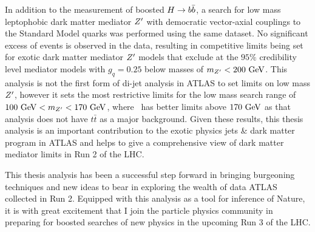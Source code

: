 In addition to the measurement of boosted $H \to b\bar{b}$, a search for low mass leptophobic dark matter mediator $Z^{\prime}$ with democratic vector-axial couplings to the Standard Model quarks was performed using the same dataset.
No significant excess of events is observed in the data, resulting in competitive limits being set for exotic dark matter mediator $Z^{\prime}$ models that exclude at the $95\%$ credibility level mediator models with $g_{q} = 0.25$ below masses of $m_{Z^{\prime}} < 200~\mathrm{GeV}$.
This analysis is not the first form of di-jet analysis in ATLAS to set limits on low mass $Z^{\prime}$, however it sets the most restrictive limits for the low mass search range of $100~\mathrm{GeV} < m_{Z^{\prime}} <170~\mathrm{GeV}$, where~\cite{EXOT-2017-01} has better limits above $170~\mathrm{GeV}$ as that analysis does not have $t\bar{t}$ as a major background.
Given these results, this thesis analysis is an important contribution to the exotic physics jets \& dark matter program in ATLAS and helps to give a comprehensive view of dark matter mediator limits in Run 2 of the LHC.

This thesis analysis has been a successful step forward in bringing burgeoning techniques and new ideas to bear in exploring the wealth of data ATLAS collected in Run 2.
Equipped with this analysis as a tool for inference of Nature, it is with great excitement that I join the particle physics community in preparing for boosted searches of new physics in the upcoming Run 3 of the LHC.
